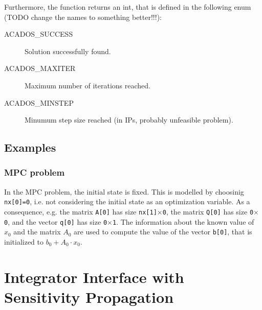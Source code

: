 \documentclass{report}
\begin{document}
Furthermore, the function returns an int, that is defined in the following enum (TODO change the names to something better!!!):
\begin{description}
\item[ACADOS\_SUCCESS] Solution successfully found.
\item[ACADOS\_MAXITER] Maximum number of iterations reached.
\item[ACADOS\_MINSTEP] Minumum step size reached (in IPs, probably unfeasible problem).
\end{description}

\subsection{Examples}

\subsubsection{MPC problem}

In the MPC problem, the initial state is fixed.
This is modelled by choosinig {\tt nx[0]=0}, i.e. not considering the initial state as an optimization variable.
As a consequence, e.g. the matrix {\tt A[0]} has size {\tt nx[1]$\times$0}, the matrix {\tt Q[0]} has size {\tt 0$\times$0}, and the vector {\tt q[0]} has size {\tt 0$\times$1}.
The information about the known value of $x_0$ and the matrix $A_0$ are used to compute the value of the vector {\tt b[0]}, that is initialized to $b_0 + A_0 \cdot x_0$.

\section{Integrator Interface with Sensitivity Propagation}
\end{document}
